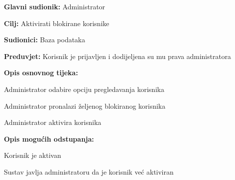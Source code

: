 				\noindent {}
					\begin{packed_item}
	
						\item \textbf{Glavni sudionik: }Administrator
						\item  \textbf{Cilj:} Aktivirati blokirane korisnike
						\item  \textbf{Sudionici:} Baza podataka
						\item  \textbf{Preduvjet:} Korisnik je prijavljen i dodijeljena su mu prava administratora
						\item  \textbf{Opis osnovnog tijeka:}
						
						\item[] \begin{packed_enum}
	
							\item Administrator odabire opciju pregledavanja korisnika
							\item Administrator pronalazi željenog blokiranog korisnika
							\item Administrator aktivira korisnika

						\end{packed_enum}
						
						\item  \textbf{Opis mogućih odstupanja:}
						
						\item[] \begin{packed_item}
	
							\item[3.a] Korisnik je aktivan
							
								\begin{packed_item}
								
									\item Sustav javlja administratoru da je korisnik već aktiviran
								
								\end{packed_item}
							
						\end{packed_item}
					\end{packed_item}
					
